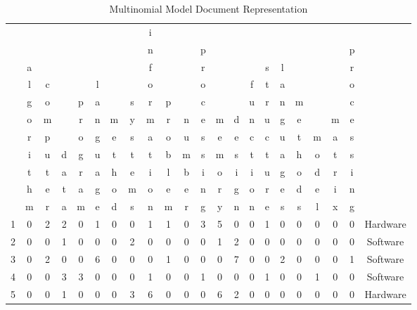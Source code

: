 \begin{table}[!ht]
	\caption{Multinomial Model Document Representation} \label{tab:multinomial-estimate}
	\hspace*{-25mm}
	\begin{center}	
	\begin{scriptsize}
	\setlength\tabcolsep{1.5pt}
		\begin{tabular}{cccccccccccccccccccccc}	
 &   &   &   &   &   &   &   & i &   &   &   &   &   &   &   &   &   &   &   &   & \\
 &   &   &   &   &   &   &   & n &   &   & p &   &   &   &   &   &   &   &   & p & \\
 & a &   &   &   &   &   &   & f &   &   & r &   &   &   & s & l &   &   &   & r & \\
 & l & c &   &   & l &   &   & o &   &   & o &   &   & f & t & a &   &   &   & o & \\
 & g & o &   & p & a &   & s & r & p &   & c &   &   & u & r & n & m &   &   & c & \\
 & o & m &   & r & n & m & y & m & r & n & e & m & d & n & u & g & e &   & m & e & \\
 & r & p &   & o & g & e & s & a & o & u & s & e & e & c & c & u & t & m & a & s & \\
 & i & u & d & g & u & t & t & t & b & m & s & m & s & t & t & a & h & o & t & s & \\
 & t & t & a & r & a & h & e & i & l & b & i & o & i & i & u & g & o & d & r & i & \\
 & h & e & t & a & g & o & m & o & e & e & n & r & g & o & r & e & d & e & i & n & \\
 & m & r & a & m & e & d & s & n & m & r & g & y & n & n & e & s & s & l & x & g & \\
      			\midrule	
1 & 0 & 2 & 2 & 0 & 1 & 0 & 0 & 1 & 1 & 0 & 3 & 5 & 0 & 0 & 1 & 0 & 0 & 0 & 0 & 0 & Hardware\\
2 & 0 & 0 & 1 & 0 & 0 & 0 & 2 & 0 & 0 & 0 & 0 & 1 & 2 & 0 & 0 & 0 & 0 & 0 & 0 & 0 & Software\\
3 & 0 & 2 & 0 & 0 & 6 & 0 & 0 & 0 & 1 & 0 & 0 & 0 & 7 & 0 & 0 & 2 & 0 & 0 & 0 & 1 & Software\\
4 & 0 & 0 & 3 & 3 & 0 & 0 & 0 & 1 & 0 & 0 & 1 & 0 & 0 & 0 & 1 & 0 & 0 & 1 & 0 & 0 & Software\\
5 & 0 & 0 & 1 & 0 & 0 & 0 & 3 & 6 & 0 & 0 & 0 & 6 & 2 & 0 & 0 & 0 & 0 & 0 & 0 & 0 & Hardware\\

\end{tabular}
\end{scriptsize}
\end{center}
\end{table}
